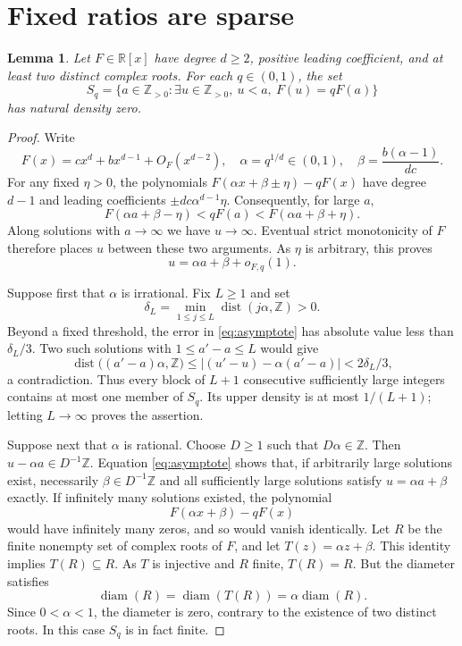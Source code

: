 \documentclass[10pt]{article}
\newtheorem{lemma}[theorem]{Lemma}
\newcommand{\Z}{\mathbb Z}
\newcommand{\R}{\mathbb R}
\begin{document}
\section{Fixed ratios are sparse}
\begin{lemma}\label{lem:sparse}
Let $F\in\R[x]$ have degree $d\ge2$, positive leading coefficient,
and at least two distinct complex roots. For each $q\in(0,1)$, the set
\[
 S_q=\{a\in\Z_{>0}:\exists u\in\Z_{>0},\ u<a,\ F(u)=qF(a)\}
\]
has natural density zero.
\end{lemma}
\begin{proof}
Write
\[
 F(x)=c x^d+b x^{d-1}+O_F(x^{d-2}),\quad
 \alpha=q^{1/d}\in(0,1),\quad
 \beta=\frac{b(\alpha-1)}{dc}.
\]
For any fixed $\eta>0$, the polynomials
$F(\alpha x+\beta\pm\eta)-qF(x)$ have degree $d-1$ and leading
coefficients $\pm dc\alpha^{d-1}\eta$. Consequently, for large $a$,
\[
 F(\alpha a+\beta-\eta)<qF(a)<F(\alpha a+\beta+\eta).
\]
Along solutions with $a\to\infty$ we have $u\to\infty$.
Eventual strict monotonicity of $F$ therefore places $u$ between these
two arguments. As $\eta$ is arbitrary, this proves
\begin{equation}\label{eq:asymptote}
                  u=\alpha a+\beta+o_{F,q}(1).
\end{equation}

Suppose first that $\alpha$ is irrational. Fix $L\ge1$ and set
\[
 \delta_L=\min_{1\le j\le L}\operatorname{dist}(j\alpha,\Z)>0.
\]
Beyond a fixed threshold, the error in \eqref{eq:asymptote} has absolute
value less than $\delta_L/3$. Two such solutions with
$1\le a'-a\le L$ would give
\[
 \operatorname{dist}\bigl((a'-a)\alpha,\Z\bigr)
 \le |(u'-u)-\alpha(a'-a)|<2\delta_L/3,
\]
a contradiction. Thus every block of $L+1$ consecutive sufficiently
large integers contains at most one member of $S_q$. Its upper density
is at most $1/(L+1)$; letting $L\to\infty$ proves the assertion.

Suppose next that $\alpha$ is rational. Choose $D\ge1$ such that
$D\alpha\in\Z$. Then $u-\alpha a\in D^{-1}\Z$.
Equation \eqref{eq:asymptote} shows that, if arbitrarily large solutions
exist, necessarily $\beta\in D^{-1}\Z$ and all sufficiently large
solutions satisfy $u=\alpha a+\beta$ exactly. If infinitely many
solutions existed, the polynomial
\[
                    F(\alpha x+\beta)-qF(x)
\]
would have infinitely many zeros, and so would vanish identically.
Let $R$ be the finite nonempty set of complex roots of $F$, and let
$T(z)=\alpha z+\beta$. This identity implies $T(R)\subseteq R$.
As $T$ is injective and $R$ finite, $T(R)=R$. But the diameter satisfies
\[
          \operatorname{diam}(R)=\operatorname{diam}(T(R))
                              =\alpha\operatorname{diam}(R).
\]
Since $0<\alpha<1$, the diameter is zero, contrary to the existence of
two distinct roots. In this case $S_q$ is in fact finite.
\end{proof}
\end{document}
